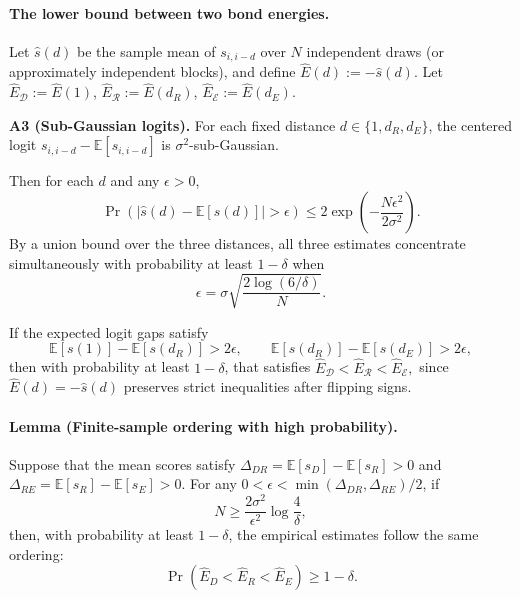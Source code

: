 \paragraph{The lower bound between two bond energies.}
Let $\widehat{s}(d)$ be the sample mean of $s_{i,i-d}$ over $N$ independent draws (or approximately independent blocks),
and define $\widehat{E}(d):=-\widehat{s}(d)$.
Let $\widehat{E}_{\mathcal{D}}:=\widehat{E}(1)$, $\widehat{E}_{\mathcal{R}}:=\widehat{E}(d_R)$, $\widehat{E}_{\mathcal{E}}:=\widehat{E}(d_E)$.

\noindent\textbf{A3 (Sub-Gaussian logits).}
For each fixed distance $d\in\{1,d_R,d_E\}$, the centered logit
$s_{i,i-d}-\mathbb{E}[s_{i,i-d}]$ is $\sigma^2$-sub-Gaussian.

Then for each $d$ and any $\epsilon>0$,
\begin{equation}
\Pr\!\left(\big|\widehat{s}(d)-\mathbb{E}[s(d)]\big|>\epsilon\right)\le
2\exp\!\left(-\frac{N\epsilon^2}{2\sigma^2}\right).
\end{equation}
By a union bound over the three distances, all three estimates concentrate simultaneously with probability at least $1-\delta$
when
\begin{equation}
\epsilon=\sigma\sqrt{\frac{2\log(6/\delta)}{N}}.
\end{equation}

If the expected logit gaps satisfy
\begin{equation}
\mathbb{E}[s(1)]-\mathbb{E}[s(d_R)] > 2\epsilon,\qquad
\mathbb{E}[s(d_R)]-\mathbb{E}[s(d_E)] > 2\epsilon,
\end{equation}
then with probability at least $1-\delta$, that satisfies
$\widehat{E}_{\mathcal{D}} < \widehat{E}_{\mathcal{R}} < \widehat{E}_{\mathcal{E}},$
since $\widehat{E}(d)=-\widehat{s}(d)$ preserves strict inequalities after flipping signs.

\paragraph{Lemma (Finite-sample ordering with high probability).} 
Suppose that the mean scores satisfy \(\Delta_{DR} = \mathbb{E}[s_D] - \mathbb{E}[s_R] > 0\) and \(\Delta_{RE} = \mathbb{E}[s_R] - \mathbb{E}[s_E] > 0\). For any \(0 < \epsilon < \min(\Delta_{DR}, \Delta_{RE})/2\), if
\begin{equation}
N \ge \frac{2\sigma^2}{\epsilon^2} \log \frac{4}{\delta},
\end{equation}
then, with probability at least $1-\delta$, the empirical estimates follow the same ordering:
\begin{equation}
\Pr(\hat{E}_D < \hat{E}_R < \hat{E}_E) \ge 1-\delta.
\end{equation}



